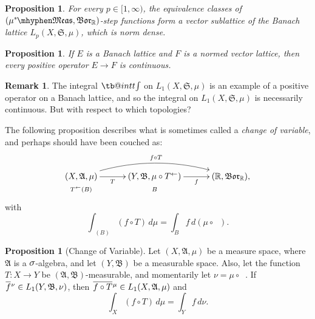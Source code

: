 \documentclass[
twoside=true,
paper=letter,
fontsize=9pt,
pagesize=auto,
leqno,
openany,
headsepline,
overfullrule,
]{scrbook}
\makeatletter
\theoremstyle{plain}
\theoremstyle{plain}
\newtheorem{prop}[thm]{Proposition}
\theoremstyle{definition}
\newtheorem{rmk}[thm]{Remark}
\theoremstyle{bfnoteitalic}
\newtheorem{propboldnote}[thm]{Proposition}
\theoremstyle{bfnoteroman}
\newcommand{\sigalg}[1]{\mathfrak{#1}}
\newcommand{\borel}{\mathfrak{Bor}}
\newcommand{\textsigma}{\hbox{\large{$\sigma$}}\kern-1pt}
\newcommand{\preimage}[1]{\mathop{#1^{\leftarrow}}}
\newcommand{\R}{\mathbb{R}}
\newcommand{\semiring}{\sigalg{S}}
\newcommand{\sigmaalgebra}{\sigalg{A}}
\newcommand{\sigmaalgebraii}{\sigalg{B}}
\newcommand{\measurable}[1]{{#1}\mhyphen\mathfrak{Meas}}
\newcommand{\kernast}{\ast\kern-1pt}
\newcommand{\function}{f}
\newcommand{\measurespace}{X}
\newcommand{\measurespaceii}{Y}
\newcommand{\measure}{\mu}
\newcommand{\measureii}{\nu}
\newcommand{\setii}{B}
\newcommand*\xbar[1]{%
   \hbox{%
     \vbox{%
       \hrule height 0.4pt %
       \kern0.4ex%
       \hbox{%
         \ensuremath{#1}%
       }%
     }%
   }%
}
\newcommand\tint{\mathop{\mathpalette\tb@int{t}}\!\int}
\newcommand\tb@int[2]{%
  \sbox\z@{$\m@th#1\int$}%
  \if#2t%
    \rlap{\hbox to\wd\z@{%
      \hfil
      \vrule width .35em height \dimexpr\ht\z@+1.4pt\relax depth -\dimexpr\ht\z@+1pt\relax
      \kern.05em %
    }}
  \else
    \rlap{\hbox to\wd\z@{%
      \vrule width .35em height -\dimexpr\dp\z@+1pt\relax depth \dimexpr\dp\z@+1.4pt\relax
      \hfil
    }}
  \fi
}
\newcommand{\lebclass}[1]{\hspace{.5pt}\xbar{#1}\hspace{0.5pt}}
\newcommand{\ellclass}[2]{\lebclass{#1}^{#2}}
\newcommand{\inducedint}{\tint}
\makeatother
\begin{document}
\begin{prop}\label{step_functions_dense}
For every $p\in [1, \infty)$, the equivalence classes of $(\measurable{\measure^\kernast}, \borel_\R)$-step functions form a vector sublattice of the Banach lattice $L_p(\measurespace, \semiring, \measure)$, which is norm dense.
\end{prop}



\begin{prop}\label{integral_continuous}
If $E$ is a Banach lattice and $F$ is a normed vector lattice, then every positive operator $E\to F$ is continuous.
\end{prop}



\begin{rmk}
The integral $\inducedint$ on $L_1(\measurespace, \semiring, \measure)$ is an example of a positive operator on a Banach lattice, and so the integral on $L_1(\measurespace, \semiring, \measure)$ is necessarily continuous. But with respect to which topologies?
\end{rmk}







The following proposition describes what is sometimes called a \emph{change of variable}, and perhaps should have been couched as:
\[
\xymatrix@R=0pt@C=30pt{ 
(\measurespace,\sigmaalgebra,\measure)
\ar[r]_-{T} \ar@/^16pt/[rr]^{f\circ T}
& (\measurespaceii,\sigmaalgebraii,\measure\circ\preimage{T})
\ar[r]_-{\function}
& (\R,\borel_\R), \\
\scriptstyle{\preimage{T}(\setii)} & \scriptstyle{\setii} & \\
}
\]
with
\[
\int_{\preimage{T}(\setii)} (\function\circ T) \, d\measure
= \int_\setii \function \, d (\measure\circ\preimage{T}).
\]


\begin{propboldnote}[Change of Variable]\label{change_of_variable}
Let $(\measurespace,\sigmaalgebra,\measure)$ be a measure space, where $\sigmaalgebra$ is a $\textsigma$-algebra, and let $(\measurespaceii, \sigmaalgebraii)$ be a measurable space.  Also, let the function $T:\measurespace\to\measurespaceii$ be $(\sigmaalgebra, \sigmaalgebraii)$\hyp{}measurable, and momentarily let 
$\measureii = \measure\circ\preimage{T}$.
If
$\ellclass{\function}{\measureii} 
\in L_1(\measurespaceii, \sigmaalgebraii, \measureii)$, 
then 
$\ellclass{\function\circ T}{\measure}
\in
L_1(\measurespace, \sigmaalgebra, \measure)$
and
\[
\int_\measurespace (f\circ T) \, d\measure
= \int_\measurespaceii f \, d\measureii.
\]
\end{propboldnote}
\end{document}
